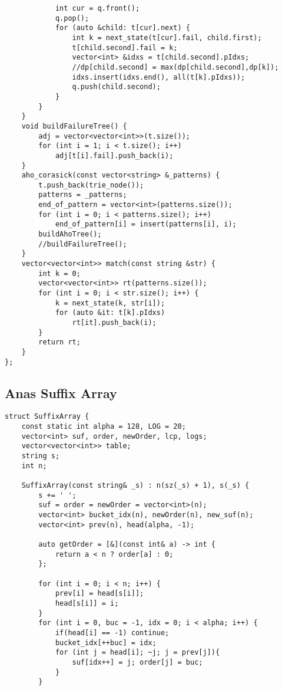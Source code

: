 \documentclass{article}
\begin{document}
{\begin{verbatim}
            int cur = q.front();  
            q.pop();  
            for (auto &child: t[cur].next) {  
                int k = next_state(t[cur].fail, child.first);  
                t[child.second].fail = k;  
                vector<int> &idxs = t[child.second].pIdxs;  
                //dp[child.second] = max(dp[child.second],dp[k]);  
                idxs.insert(idxs.end(), all(t[k].pIdxs));  
                q.push(child.second);  
            }  
        }  
    }  
    void buildFailureTree() {  
        adj = vector<vector<int>>(t.size());  
        for (int i = 1; i < t.size(); i++)  
            adj[t[i].fail].push_back(i);  
    }  
    aho_corasick(const vector<string> &_patterns) {  
        t.push_back(trie_node());  
        patterns = _patterns;  
        end_of_pattern = vector<int>(patterns.size());  
        for (int i = 0; i < patterns.size(); i++)  
            end_of_pattern[i] = insert(patterns[i], i);  
        buildAhoTree();  
        //buildFailureTree();  
    }  
    vector<vector<int>> match(const string &str) {  
        int k = 0;  
        vector<vector<int>> rt(patterns.size());  
        for (int i = 0; i < str.size(); i++) {  
            k = next_state(k, str[i]);  
            for (auto &it: t[k].pIdxs)  
                rt[it].push_back(i);  
        }  
        return rt;  
    }  
};
\end{verbatim}

\subsection{Anas Suffix Array}
\begin{verbatim}
struct SuffixArray {
    const static int alpha = 128, LOG = 20;
    vector<int> suf, order, newOrder, lcp, logs;
    vector<vector<int>> table;
    string s;
    int n;

    SuffixArray(const string& _s) : n(sz(_s) + 1), s(_s) {
        s += ' ';
        suf = order = newOrder = vector<int>(n);
        vector<int> bucket_idx(n), newOrder(n), new_suf(n);
        vector<int> prev(n), head(alpha, -1);

        auto getOrder = [&](const int& a) -> int {
            return a < n ? order[a] : 0;
        };

        for (int i = 0; i < n; i++) {
            prev[i] = head[s[i]];
            head[s[i]] = i;
        }
        for (int i = 0, buc = -1, idx = 0; i < alpha; i++) {
            if(head[i] == -1) continue;
            bucket_idx[++buc] = idx;
            for (int j = head[i]; ~j; j = prev[j]){
                suf[idx++] = j; order[j] = buc;
            }
        }


\end{verbatim}}
\end{document}
